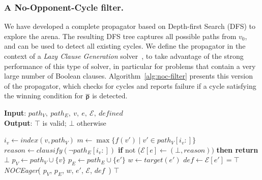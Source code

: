\documentclass[runningheads]{llncs}
\begin{document}
\subsubsection{A No-Opponent-Cycle filter.} \label{sec:nocfilter}
We have developed a complete propagator based on Depth-first Search (DFS) to explore the arena. The resulting DFS tree captures all possible paths from $v_0$, and can be used to detect all existing cycles. We define the propagator in the context of a \textit{Lazy Clause Generation} solver~\cite{DBLP:journals/constraints/OhrimenkoSC09}, to take advantage of the strong performance of this type of solver, in particular for problems that contain a very large number of Boolean clauses. Algorithm~\ref{alg:noc-filter} presents this version of the propagator, which checks for cycles and reports failure if a cycle 
satisfying the winning condition for 
$\overline{\mathsf{p}}$ is detected.

\begin{algorithm}[htb]
\small
\caption{\textbf{\textit{NOCFilter}}}
\textbf{Input}: $path_V,\ path_E,\ v,\ e,\ \mathcal{E},\ \textit{defined}$ \\
\textbf{Output}: $\top$ is valid; $\bot$ otherwise
\begin{algorithmic}[1]
     \label{alg:noc-filter:pathcheck}
        \STATE $i_v \gets \textit{index}(v, path_V)$
        \STATE $m \gets \max\{f(v') \mid v' \in path_V[i_v:]\}$
        \IF{$\neg \gamma_{\player}$} \label{alg:noc-filter:condition}
            \STATE $\textit{reason} \gets \textit{clausify}(\neg path_E[i_v:])$ \label{alg:noc-eager:reason}
            \STATE \textbf{if }not ($\mathcal{E}[e] \gets (\bot, \textit{reason}))$ \textbf{then return $\bot$}
        \ENDIF
     \label{alg:noc-eager:defcheck}
         \label{alg:no-opponent-cycle-f1:edgecheck}
            \STATE $p_V \gets path_V \cup \{v\}$
            \STATE $p_E \gets path_E \cup \{e'\}$
            \STATE $w \gets \textit{target}(e')$
            \STATE $\textit{def} \gets \mathcal{E}[e'] = \top$
            \STATE \textit{NOCEager}(
                $p_V$,
                $p_E$,
                $w$,
                $e'$,
                $\mathcal{E}$,
                $\textit{def}$\ )
        \ENDFOR
    \ENDIF
    \RETURN $\top$
\end{algorithmic}
\label{alg:noc-filter}
\end{algorithm}
\end{document}
